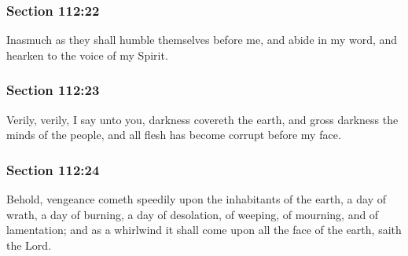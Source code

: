 	\subsubsection{Section 112:22} %
		\label{DC112-22}

		Inasmuch as they shall humble themselves before me, and abide in my word, and hearken to the voice of my Spirit.


	\subsubsection{Section 112:23} %
		\label{DC112-23}

		Verily, verily, I say unto you, darkness covereth the earth, and gross darkness the minds of the people, and all flesh has become corrupt before my face.


	\subsubsection{Section 112:24} %
		\label{DC112-24}

		Behold, vengeance cometh speedily upon the inhabitants of the earth, a day of wrath, a day of burning, a day of desolation, of weeping, of mourning, and of lamentation; and as a whirlwind it shall come upon all the face of the earth, saith the Lord.


